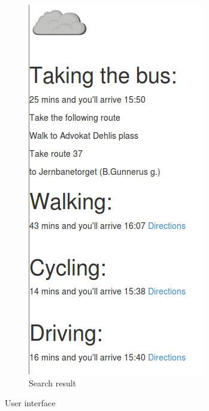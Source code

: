 \documentclass[10pt,a4paper]{article}
\begin{document}
\begin{figure}[h]
\begin{subfigure}{0.4\textwidth}
  \includegraphics[width=\textwidth]{../ux/result}
  \caption{Search result}
  \label{fig:ux_result}
\end{subfigure}
  \caption{User interface}
  \label{fig:ux_last}
\end{figure}
\end{document}
